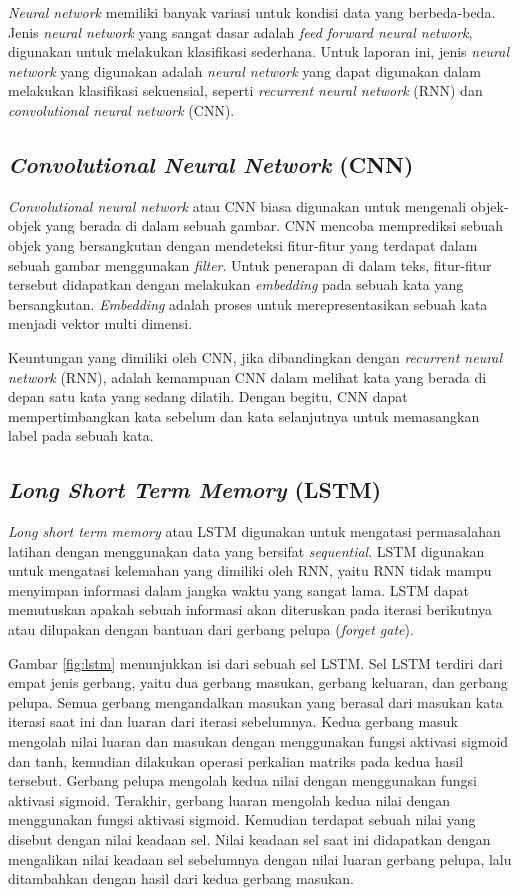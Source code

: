 \textit{Neural network} memiliki banyak variasi untuk kondisi data yang berbeda-beda. Jenis \textit{neural network} yang sangat dasar adalah \textit{feed forward neural network}, digunakan untuk melakukan klasifikasi sederhana. Untuk laporan ini, jenis \textit{neural network} yang digunakan adalah \textit{neural network} yang dapat digunakan dalam melakukan klasifikasi sekuensial, seperti \textit{recurrent neural network} (RNN) dan \textit{convolutional neural network} (CNN).

\subsection{\textit{Convolutional Neural Network} (CNN)}

\textit{Convolutional neural network} atau CNN biasa digunakan untuk mengenali objek-objek yang berada di dalam sebuah gambar. CNN mencoba memprediksi sebuah objek yang bersangkutan dengan mendeteksi fitur-fitur yang terdapat dalam sebuah gambar menggunakan \textit{filter}. Untuk penerapan di dalam teks, fitur-fitur tersebut didapatkan dengan melakukan \textit{embedding} pada sebuah kata yang bersangkutan. \textit{Embedding} adalah proses untuk merepresentasikan sebuah kata menjadi vektor multi dimensi.

Keuntungan yang dimiliki oleh CNN, jika dibandingkan dengan \textit{recurrent neural network} (RNN), adalah kemampuan CNN dalam melihat kata yang berada di depan satu kata yang sedang dilatih. Dengan begitu, CNN dapat mempertimbangkan kata sebelum dan kata selanjutnya untuk memasangkan label pada sebuah kata.

\subsection{\textit{Long Short Term Memory} (LSTM)}

\textit{Long short term memory} atau LSTM digunakan untuk mengatasi permasalahan latihan dengan menggunakan data yang bersifat \textit{sequential}. LSTM digunakan untuk mengatasi kelemahan yang dimiliki oleh RNN, yaitu RNN tidak mampu menyimpan informasi dalam jangka waktu yang sangat lama. LSTM dapat memutuskan apakah sebuah informasi akan diteruskan pada iterasi berikutnya atau dilupakan dengan bantuan dari gerbang pelupa (\textit{forget gate}).

Gambar \ref{fig:lstm} menunjukkan isi dari sebuah sel LSTM. Sel LSTM terdiri dari empat jenis gerbang, yaitu dua gerbang masukan, gerbang keluaran, dan gerbang pelupa. Semua gerbang mengandalkan masukan yang berasal dari masukan kata iterasi saat ini dan luaran dari iterasi sebelumnya. Kedua gerbang masuk mengolah nilai luaran dan masukan dengan menggunakan fungsi aktivasi sigmoid dan tanh, kemudian dilakukan operasi perkalian matriks pada kedua hasil tersebut. Gerbang pelupa mengolah kedua nilai dengan menggunakan fungsi aktivasi sigmoid. Terakhir, gerbang luaran mengolah kedua nilai dengan menggunakan fungsi aktivasi sigmoid. Kemudian terdapat sebuah nilai yang disebut dengan nilai keadaan sel. Nilai keadaan sel saat ini didapatkan dengan mengalikan nilai keadaan sel sebelumnya dengan nilai luaran gerbang pelupa, lalu ditambahkan dengan hasil dari kedua gerbang masukan.

